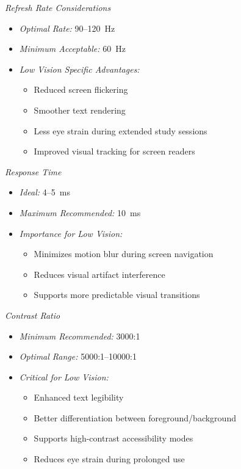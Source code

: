 \textit{Refresh Rate Considerations}
\begin{itemize}
    \item \emph{Optimal Rate:} 90--120~Hz
    \item \emph{Minimum Acceptable:} 60~Hz
    \item \emph{Low Vision Specific Advantages:}
        \begin{itemize}
            \item Reduced screen flickering
            \item Smoother text rendering
            \item Less eye strain during extended study sessions
            \item Improved visual tracking for screen readers
        \end{itemize}
\end{itemize}

\textit{Response Time}
\begin{itemize}
    \item \emph{Ideal:} 4--5~ms
    \item \emph{Maximum Recommended:} 10~ms
    \item \emph{Importance for Low Vision:}
        \begin{itemize}
            \item Minimizes motion blur during screen navigation
            \item Reduces visual artifact interference
            \item Supports more predictable visual transitions
        \end{itemize}
\end{itemize}

\textit{Contrast Ratio}
\begin{itemize}
    \item \emph{Minimum Recommended:} 3000:1
    \item \emph{Optimal Range:} 5000:1--10000:1
    \item \emph{Critical for Low Vision:}
        \begin{itemize}
            \item Enhanced text legibility
            \item Better differentiation between foreground/background
            \item Supports high-contrast accessibility modes
            \item Reduces eye strain during prolonged use
        \end{itemize}
\end{itemize}

